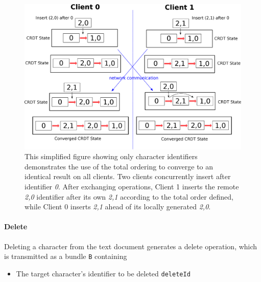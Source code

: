 \documentclass[12pt,a4paper,twoside,openright]{report}
\begin{document}
				
			\begin{figure}[H]
				\centering
				\includegraphics[width=1\linewidth]{figs/totalordering.eps}
				\caption[Convergence using Total Order]{This simplified figure showing only character identifiers demonstrates the use of the total ordering to converge to an identical result on all clients. Two clients concurrently insert after identifier \textit{0}. After exchanging operations, Client 1 inserts the remote \textit{2,0} identifier after its own \textit{2,1} according to the total order defined, while Client 0 inserts \textit{2,1} ahead of its locally generated \textit{2,0}.}
				\label{fig:totalorder}
			\end{figure}
				
			\paragraph{Delete}
				Deleting a character from the text document generates a delete operation, which is transmitted as a bundle \texttt{B} containing
				\begin{itemize}
					\item The target character's identifier to be deleted \texttt{deleteId}
				\end{itemize}
				
\end{document}
